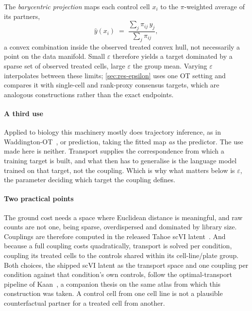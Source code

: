 The \emph{barycentric projection} maps each control cell $x_i$ to the
$\pi$-weighted average of its partners,
\begin{equation}
  \hat{y}(x_i) \;=\; \frac{\sum_j \pi_{ij}\, y_j}{\sum_j \pi_{ij}},
\end{equation}
a convex combination inside the observed treated convex hull, not necessarily a
point on the data manifold. Small $\varepsilon$ therefore yields a target
dominated by a sparse set of observed treated cells, large $\varepsilon$ the
group mean. Varying $\varepsilon$ interpolates between these limits;
\cref{sec:res-epsilon} uses one OT setting and compares it with single-cell
and rank-proxy consensus targets, which are analogous constructions rather
than the exact endpoints.

\paragraph{A third use} Applied to biology this machinery mostly does
trajectory inference, as in Wad\-ding\-ton-OT~\cite{schiebinger}, or prediction,
taking the fitted map \emph{as} the predictor. The use made here is neither.
Transport supplies the correspondence from which a training target is built, and
what then has to generalise is the language model trained on that target, not the
coupling. Which is why what matters below is $\varepsilon$, the parameter
deciding which target the coupling defines.

\paragraph{Two practical points} The ground cost needs a space where Euclidean
distance is meaningful, and raw counts are not one, being sparse, overdispersed
and dominated by library size. Couplings are therefore computed in the released Tahoe scVI latent~\cite{scvi}. And because a full coupling costs quadratically, transport is solved per condition, coupling its treated cells to the controls shared within its cell-line/plate group. Both choices, the shipped scVI latent as the transport space and one coupling per condition against that condition's own controls, follow the optimal-transport pipeline of Kaan~\cite{mertkaan}, a companion thesis on the same atlas from which this construction was taken. A control cell from one cell line is not
a plausible counterfactual partner for a treated cell from another.
